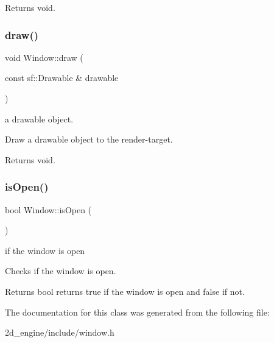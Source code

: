 \begin{DoxyReturn}{Returns}
void. 
\end{DoxyReturn}
\mbox{\label{class_window_adfb2d5826942693e289d13f314a341f7}} 
\subsubsection{\texorpdfstring{draw()}{draw()}}
{\footnotesize\ttfamily void Window\+::draw (\begin{DoxyParamCaption}\item[{const sf\+::\+Drawable \&}]{drawable }\end{DoxyParamCaption})}

a drawable object.

Draw a drawable object to the render-\/target.

\begin{DoxyReturn}{Returns}
void. 
\end{DoxyReturn}
\mbox{\label{class_window_a0530ead23b2c91ef90a5f98e4df41cb8}} 
\subsubsection{\texorpdfstring{is\+Open()}{isOpen()}}
{\footnotesize\ttfamily bool Window\+::is\+Open (\begin{DoxyParamCaption}{ }\end{DoxyParamCaption})}

if the window is open

Checks if the window is open.

\begin{DoxyReturn}{Returns}
bool returns true if the window is open and false if not. 
\end{DoxyReturn}


The documentation for this class was generated from the following file\+:\begin{DoxyCompactItemize}
\item 
2d\+\_\+engine/include/window.\+h\end{DoxyCompactItemize}
